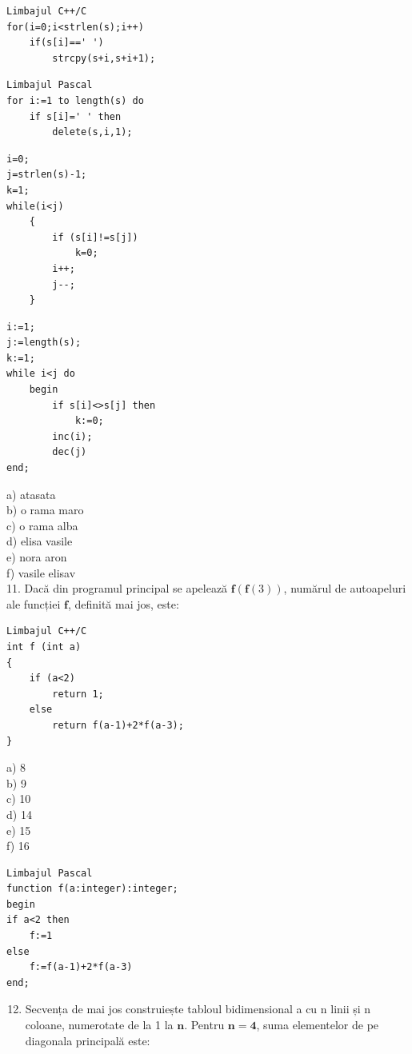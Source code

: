 \documentclass[10pt]{article}
\begin{document}
\begin{verbatim}
Limbajul C++/C
for(i=0;i<strlen(s);i++)
    if(s[i]==' ')
        strcpy(s+i,s+i+1);
\end{verbatim}

\begin{verbatim}
Limbajul Pascal
for i:=1 to length(s) do
    if s[i]=' ' then
        delete(s,i,1);
\end{verbatim}

\begin{verbatim}
i=0;
j=strlen(s)-1;
k=1;
while(i<j)
    {
        if (s[i]!=s[j])
            k=0;
        i++;
        j--;
    }
\end{verbatim}

\begin{verbatim}
i:=1;
j:=length(s);
k:=1;
while i<j do
    begin
        if s[i]<>s[j] then
            k:=0;
        inc(i);
        dec(j)
end;
\end{verbatim}

a) atasata\\
b) o rama maro\\
c) o rama alba\\
d) elisa vasile\\
e) nora aron\\
f) vasile elisav\\
11. Dacă din programul principal se apelează $\mathbf{f}(\mathbf{f}(3))$, numărul de autoapeluri ale funcției $\mathbf{f}$, definită mai jos, este:

\begin{verbatim}
Limbajul C++/C
int f (int a)
{
    if (a<2)
        return 1;
    else
        return f(a-1)+2*f(a-3);
}
\end{verbatim}

a) 8\\
b) 9\\
c) 10\\
d) 14\\
e) 15\\
f) 16

\begin{verbatim}
Limbajul Pascal
function f(a:integer):integer;
begin
if a<2 then
    f:=1
else
    f:=f(a-1)+2*f(a-3)
end;
\end{verbatim}

\begin{enumerate}
  \setcounter{enumi}{11}
  \item Secvența de mai jos construiește tabloul bidimensional a cu n linii și n coloane, numerotate de la 1 la $\mathbf{n}$. Pentru $\mathbf{n = 4}$, suma elementelor de pe diagonala principală este:
\end{enumerate}
\end{document}
